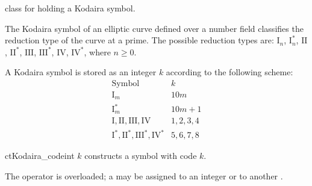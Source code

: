 

\NAME

 \dotfill class for holding a Kodaira symbol.



\ABSTRACT

The Kodaira symbol of an elliptic curve defined over a number field classifies the reduction
type of the curve at a prime.  The possible reduction types are: $\mathrm{I}_n$,
$\mathrm{I}^*_n$, $\mathrm{II}$, $\mathrm{II}^*$, $\mathrm{III}$, $\mathrm{III}^*$,
$\mathrm{IV}$, $\mathrm{IV}^*$, where $n \geq 0$.



\DESCRIPTION

A Kodaira symbol is stored as an integer $k$ according to the following scheme:
\begin{displaymath}
  \begin {array}{cc}
    \mathrm{Symbol}                         & k \\
    \mathrm{I}_m                            & 10 m \\
    \mathrm{I}^*_m                          & 10 m+1 \\
    \mathrm{I, II, III, IV}                 & 1, 2, 3, 4 \\
    \mathrm{I}^*, \mathrm{II}^*, \mathrm{III}^*, \mathrm{IV}^* & 5, 6, 7, 8
  \end{array}
\end{displaymath}



\CONS

\begin{fcode}{ct}{Kodaira_code}{int $k$}
  constructs a symbol with code $k$.
\end{fcode}



\ASGN

The operator \code{=} is overloaded; a  may be assigned to an integer or to
another .


